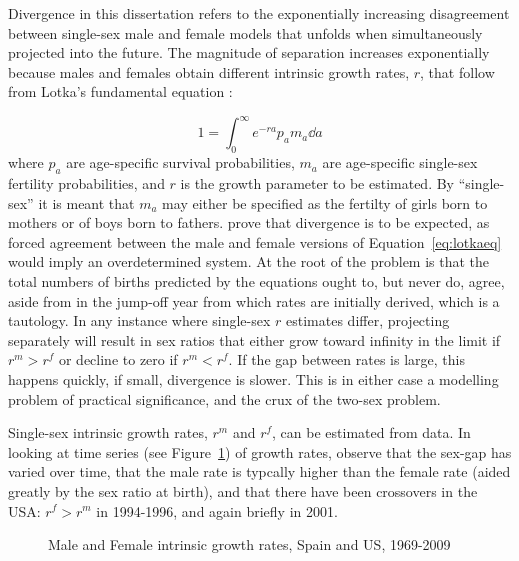 
Divergence in this dissertation refers to the exponentially
increasing disagreement between single-sex male and female models that unfolds when
simultaneously projected into the future. The magnitude of separation increases
exponentially because males and females obtain different intrinsic growth rates,
$r$, that follow from Lotka's fundamental equation \citep{sharpe1911problem}:

\begin{equation}
\label{eq:lotkaeq}
1 = \int _0 ^\infty e^{-ra}p_a m_a \dd a 
\end{equation}
where $p_a$ are age-specific survival probabilities, $m_a$ are age-specific
single-sex fertility probabilities, and $r$ is the growth parameter to be
estimated. By ``single-sex'' it is meant that $m_a$ may either be specified
as the fertilty of girls born to mothers or of boys born to fathers.
\citet{yellin1977comparison} prove that divergence is to be expected, as forced
agreement between the male and female versions of
 Equation~\eqref{eq:lotkaeq} would imply an overdetermined system. 
At the root of the problem is that the total numbers of births predicted
by the equations ought to, but never do, agree, aside from in the jump-off year
from which rates are initially derived, which is a tautology. In any instance
where single-sex $r$ estimates differ, projecting separately will result in sex
ratios that either grow toward infinity in the limit if $r^m
> r^f$ or decline to zero if $r^m < r^f$. If the gap between rates is large, this happens
quickly, if small, divergence is slower. This is in either case a modelling
problem of practical significance, and the crux of the two-sex problem. 

Single-sex intrinsic growth rates, $r^m$ and $r^f$, can be 
estimated from data. In looking at time series (see Figure~\ref{fig:rmf}) of 
 growth rates, observe that the sex-gap has varied over 
time, that the male rate is typcally higher than the female rate (aided greatly 
by the sex ratio at birth), and that there have been crossovers in the USA: 
$r^f > r^m$ in 1994-1996, and again briefly in 2001. 

\begin{figure}[ht!]
        \centering  
          \caption{Male and Female intrinsic growth rates, Spain and US,
          1969-2009}
          \label{fig:rmf}
\end{figure}

